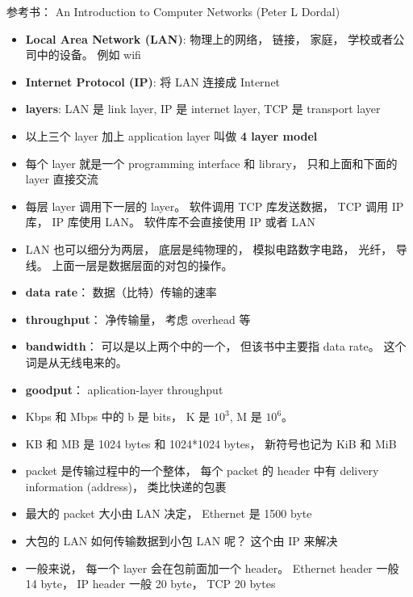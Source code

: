 
\begin{issues}
\issueDraft
\end{issues}

参考书： An Introduction to Computer Networks (Peter L Dordal)
\begin{itemize}
\item \textbf{Local Area Network (LAN)}: 物理上的网络， 链接， 家庭， 学校或者公司中的设备。 例如 wifi
\item \textbf{Internet Protocol (IP)}: 将 LAN 连接成 Internet
\item \textbf{layers}: LAN 是 link layer, IP 是 internet layer, TCP 是 transport layer
\item 以上三个 layer 加上 application layer 叫做 \textbf{4 layer model}
\item 每个 layer 就是一个 programming interface 和 library， 只和上面和下面的 layer 直接交流
\item 每层 layer 调用下一层的 layer。 软件调用 TCP 库发送数据， TCP 调用 IP 库， IP 库使用 LAN。 软件库不会直接使用 IP 或者 LAN
\item LAN 也可以细分为两层， 底层是纯物理的， 模拟电路数字电路， 光纤， 导线。 上面一层是数据层面的对包的操作。
\item \textbf{data rate}： 数据（比特）传输的速率
\item \textbf{throughput}： 净传输量， 考虑 overhead 等
\item \textbf{bandwidth}： 可以是以上两个中的一个， 但该书中主要指 data rate。 这个词是从无线电来的。
\item \textbf{goodput}： aplication-layer throughput
\item Kbps 和 Mbps 中的 b 是 bits， K 是 $10^3$, M 是 $10^6$。
\item KB 和 MB 是 1024 bytes 和 1024*1024 bytes， 新符号也记为 KiB 和 MiB
\item packet 是传输过程中的一个整体， 每个 packet 的 header 中有 delivery information (address)， 类比快递的包裹
\item 最大的 packet 大小由 LAN 决定， Ethernet 是 1500 byte
\item 大包的 LAN 如何传输数据到小包 LAN 呢？ 这个由 IP 来解决
\item 一般来说， 每一个 layer 会在包前面加一个 header。 Ethernet header 一般 14 byte， IP header 一般 20 byte， TCP 20 bytes
\end{itemize}


